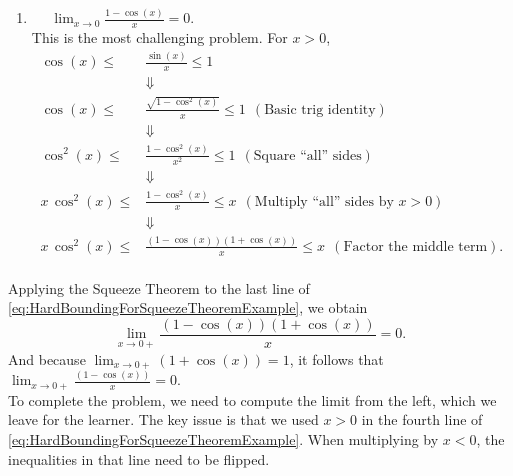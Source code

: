 \begin{enumerate}
    \item \Ans ~~ $\displaystyle \lim_{x \to 0} \frac{1 - \cos(x)}{x} = 0$.\\

This is the most challenging problem. For $x>0$,
\begin{equation}
\label{eq:HardBoundingForSqueezeTheoremExample}
    \begin{aligned}
        \cos(x) \le & \frac{\sin(x)}{x} \le 1 \\
       & \Downarrow \\  
               \cos(x) \le & \frac{\sqrt{1 - \cos^2(x)}}{x} \le 1 ~~(\text{Basic trig identity})\\
       & \Downarrow \\  
    \cos^2(x) \le & \frac{1 - \cos^2(x)}{x^2} \le 1 ~~(\text{Square ``all'' sides})\\
       & \Downarrow \\   
          x\,  \cos^2(x) \le & \frac{1 - \cos^2(x)}{x} \le x ~~(\text{Multiply ``all'' sides by } x>0)\\
       & \Downarrow \\ 
        x\,  \cos^2(x) \le & \frac{\left(1 - \cos(x) \right) \left(1 + \cos(x) \right)}{x} \le x ~~(\text{Factor the middle term}).\\  
    \end{aligned}
\end{equation}
\end{enumerate}
Applying the Squeeze Theorem to the last line of \eqref{eq:HardBoundingForSqueezeTheoremExample}, we obtain
$$\lim_{x \to 0+}  \frac{\left(1 - \cos(x) \right) \left(1 + \cos(x) \right)}{x}  = 0.$$
And because $\displaystyle \lim_{x \to 0+} \left(1 + \cos(x) \right) = 1$, it follows that $\lim_{x \to 0+}  \frac{\left(1 - \cos(x) \right) }{x}  = 0$.\\

To complete the problem, we need to compute the limit from the left, which we leave for the learner. The key issue is that we used $x>0$ in the fourth line of 
\eqref{eq:HardBoundingForSqueezeTheoremExample}. When multiplying by $x<0$, the inequalities in that line need to be flipped.
\Qed
\bigskip 


